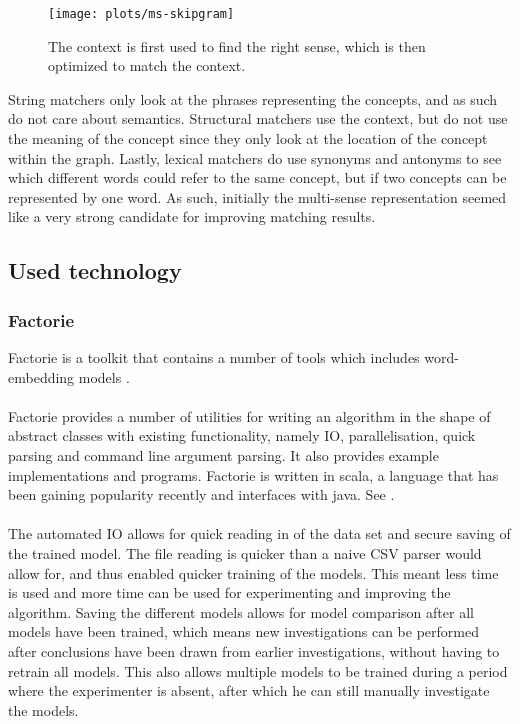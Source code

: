 \documentclass{article}
\begin{document}
 \begin{figure}[H]
 \centering
 \texttt{[image: plots/ms-skipgram]}
 \caption[Multi-sense Skip-gram]{The context is first used to find the right sense, which is then optimized to match the context.}
 \label{ms-skipgram}
 \end{figure}

 String matchers only look at the phrases representing the concepts, and as such do not care about semantics. Structural matchers use the context, but do not use the meaning of the concept since they only look at the location of the concept within the graph. Lastly, lexical matchers do use synonyms and antonyms to see which different words could refer to the same concept, but if two concepts can be represented by one word. As such, initially the multi-sense representation seemed like a very strong candidate for improving matching results.
 
 \subsection{Used technology}
 \subsubsection{Factorie} \label{factorie}
 Factorie is a toolkit that contains a number of tools which includes word-embedding models \cite{git-factorie, w2v}.
 \paragraph{}
 Factorie provides a number of utilities for writing an algorithm in the shape of abstract classes with existing functionality, namely IO, parallelisation, quick parsing and command line argument parsing. It also provides example implementations and programs. Factorie is written in scala, a language that has been gaining popularity recently and interfaces with java. See \cite{scala}. 
 \paragraph{}
 The automated IO allows for quick reading in of the data set and secure saving of the trained model. The file reading is quicker than a naive CSV parser would allow for, and thus enabled quicker training of the models. This meant less time is used and more time can be used for experimenting and improving the algorithm. Saving the different models allows for model comparison after all models have been trained, which means new investigations can be performed after conclusions have been drawn from earlier investigations, without having to retrain all models. This also allows multiple models to be trained during a period where the experimenter is absent, after which he can still manually investigate the models.
\end{document}

